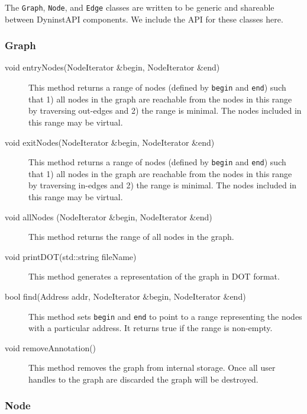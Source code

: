 \documentclass[12pt,titlepage]{article}
\begin{document}
The \texttt{Graph}, \texttt{Node}, and \texttt{Edge} classes are written to be generic and
shareable between DyninstAPI components. We include the API for these
classes here.

\subsubsection{Graph}

\begin{description}

\item[void entryNodes(NodeIterator \&begin, NodeIterator \&end)] This
method returns a range of nodes (defined by \texttt{begin} and
\texttt{end}) such that 1) all nodes in the graph are reachable from
the nodes in this range by traversing out-edges and 2) the range is
minimal. The nodes included in this range may be virtual.
\item[void exitNodes(NodeIterator \&begin, NodeIterator \&end)] This
method returns a range of nodes (defined by \texttt{begin} and
\texttt{end}) such that 1) all nodes in the graph are reachable from
the nodes in this range by traversing in-edges and 2) the range is
minimal. The nodes included in this range may be virtual.
\item[void allNodes (NodeIterator \&begin, NodeIterator \&end)]
This method returns the range of all nodes in the graph.
\item[void printDOT(std::string fileName)]
This method generates a representation of the graph in DOT format.
\item[bool find(Address addr, NodeIterator \&begin, NodeIterator \&end)]
This method sets \texttt{begin} and \texttt{end} to point to a range
representing the nodes with a particular address. It returns true if
the range is non-empty. 
\item[void removeAnnotation()] This method removes the graph from
internal storage. Once all user handles to the graph are discarded the
graph will be destroyed.
\end{description}

\subsubsection{Node}
\end{document}
